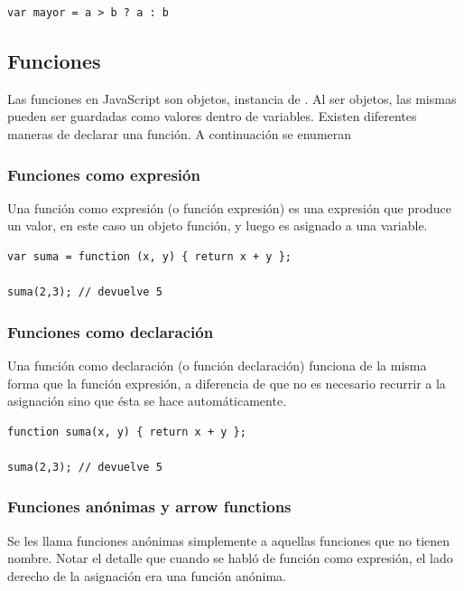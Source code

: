 \begin{lstlisting}[title={Operador ternario \code{?:}}]
var mayor = a > b ? a : b
\end{lstlisting}

\subsection{Funciones}

Las funciones en JavaScript son objetos, instancia de . Al ser objetos, las mismas pueden ser guardadas como valores dentro de variables. Existen diferentes maneras de declarar una función. A continuación se enumeran 

\subsubsection{Funciones como expresión}

Una función como expresión (o función expresión) es una expresión que produce un valor, en este caso un objeto función, y luego es asignado a una variable.

\begin{lstlisting}[title={Función expresión}]
var suma = function (x, y) { return x + y };

suma(2,3); // devuelve 5
\end{lstlisting}

\subsubsection{Funciones como declaración}

Una función como declaración (o función declaración) funciona de la misma forma que la función expresión, a diferencia de que no es necesario recurrir a la asignación sino que ésta se hace automáticamente.

\begin{lstlisting}[title={Función declaración}]
function suma(x, y) { return x + y };

suma(2,3); // devuelve 5
\end{lstlisting}

\subsubsection{Funciones anónimas y arrow functions}

Se les llama funciones anónimas simplemente a aquellas funciones que no tienen nombre. Notar el detalle que cuando se habló de función como expresión, el lado derecho de la asignación era una función anónima.

